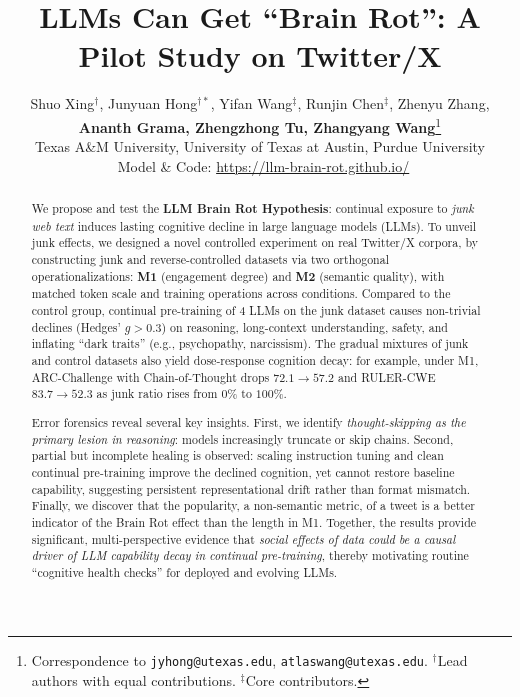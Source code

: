 \documentclass{article} %
\title{LLMs Can Get ``Brain Rot'': A Pilot Study on Twitter/X}
\author{Shuo Xing$^\dagger$\tamu, Junyuan Hong$^{\dagger*}$\utexas, Yifan Wang$^\ddag$\purdue, Runjin Chen$^\ddag$\utexas, Zhenyu Zhang\utexas, \\
\textbf{Ananth Grama\purdue, Zhengzhong Tu\tamu, Zhangyang Wang\utexas}\thanks{Correspondence to \texttt{jyhong@utexas.edu}, \texttt{atlaswang@utexas.edu}. $^\dagger$Lead authors with equal contributions. $^\ddag$Core contributors.
} \\
       \tamu Texas A\&M University,
       \utexas University of Texas at Austin, \purdue Purdue University \\
       \faGlobe~Model \& Code: \url{https://llm-brain-rot.github.io/}
       }
\theoremstyle{remark}
\begin{document}
\maketitle

\begin{abstract}
  We propose and test the \textbf{LLM Brain Rot Hypothesis}: continual exposure to \textit{junk web text} induces lasting cognitive decline in large language models (LLMs). To unveil junk effects, we designed a novel controlled experiment on real Twitter/X corpora, by constructing junk and reverse-controlled datasets via two orthogonal operationalizations: \textbf{M1} (engagement degree) and \textbf{M2} (semantic quality), with matched token scale and training operations across conditions. Compared to the control group, continual pre-training of 4 LLMs on the junk dataset causes non-trivial declines (Hedges' $g>0.3$) on reasoning, long-context understanding, safety, and inflating ``dark traits'' (e.g., psychopathy, narcissism). The gradual mixtures of junk and control datasets also yield dose-response cognition decay: for example, under M1, ARC-Challenge with Chain-of-Thought drops $72.1 \rightarrow 57.2$ and RULER-CWE $83.7 \rightarrow 52.3$ as junk ratio rises from $0\%$ to $100\%$.

  Error forensics reveal several key insights. First, we identify \textit{thought-skipping as the primary lesion in reasoning}: models increasingly truncate or skip chains. Second, partial but incomplete healing is observed: scaling instruction tuning and clean continual pre-training improve the declined cognition, yet cannot restore baseline capability, suggesting persistent representational drift rather than format mismatch. Finally, we discover that the popularity, a non-semantic metric, of a tweet is a better indicator of the Brain Rot effect than the length in M1. Together, the results provide significant, multi-perspective evidence that \textit{social effects of data could be a causal driver of LLM capability decay in continual pre-training}, thereby motivating routine ``cognitive health checks'' for deployed and evolving LLMs.
\end{abstract}






\end{document}
